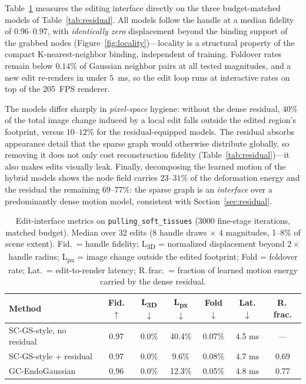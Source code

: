 \documentclass[AMA,Times1COL]{WileyNJDv5} %
\begin{document}
Table~\ref{tab:edit} measures the editing interface directly on the three budget-matched models of Table~\ref{tab:residual}. All models follow the handle at a median fidelity of $0.96$--$0.97$, with \emph{identically zero} displacement beyond the binding support of the grabbed nodes (Figure~\ref{fig:locality})---locality is a structural property of the compact K-nearest-neighbor binding, independent of training. Foldover rates remain below $0.14\%$ of Gaussian neighbor pairs at all tested magnitudes, and a new edit re-renders in under $5$~ms, so the edit loop runs at interactive rates on top of the 205~FPS renderer.

The models differ sharply in \emph{pixel-space} hygiene: without the dense residual, $40\%$ of the total image change induced by a local edit falls outside the edited region's footprint, versus $10$--$12\%$ for the residual-equipped models. The residual absorbs appearance detail that the sparse graph would otherwise distribute globally, so removing it does not only cost reconstruction fidelity (Table~\ref{tab:residual})---it also makes edits visually leak. Finally, decomposing the learned motion of the hybrid models shows the node field carries $23$--$31\%$ of the deformation energy and the residual the remaining $69$--$77\%$: the sparse graph is an \emph{interface} over a predominantly dense motion model, consistent with Section~\ref{sec:residual}.

\begin{table}[t]%
\centering
\caption{Edit-interface metrics on \texttt{pulling\_soft\_tissues} (3000 fine-stage iterations, matched budget). Median over 32 edits (8 handle draws $\times$ 4 magnitudes, 1--8\% of scene extent). Fid.\ = handle fidelity; L\textsubscript{3D} = normalized displacement beyond $2\times$ handle radius; L\textsubscript{px} = image change outside the edited footprint; Fold = foldover rate; Lat.\ = edit-to-render latency; R.\,frac.\ = fraction of learned motion energy carried by the dense residual.\label{tab:edit}}%
\begin{tabular*}{\columnwidth}{@{\extracolsep\fill}lcccccc@{\extracolsep\fill}}
\toprule
\textbf{Method} & \textbf{Fid.}$\uparrow$ & \textbf{L\textsubscript{3D}}$\downarrow$ & \textbf{L\textsubscript{px}}$\downarrow$ & \textbf{Fold}$\downarrow$ & \textbf{Lat.}$\downarrow$ & \textbf{R.\,frac.} \\
\midrule
SC-GS-style, no residual & 0.97 & 0.0\% & 40.4\% & 0.07\% & 4.5 ms & --- \\
SC-GS-style + residual   & 0.97 & 0.0\% & \phantom{0}9.6\% & 0.08\% & 4.7 ms & 0.69 \\
GC-EndoGaussian          & 0.96 & 0.0\% & 12.3\% & 0.05\% & 4.8 ms & 0.77 \\
\bottomrule
\end{tabular*}
\end{table}
\end{document}
